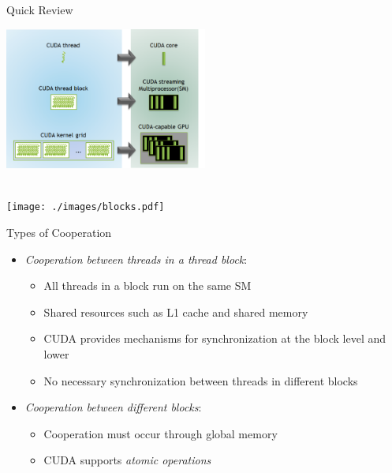 \documentclass[aspectratio=43]{beamer}
\begin{document}
\begin{frame}[fragile]{Quick Review}

\begin{center}
    \includegraphics[width=0.5\textwidth]{./image_png/review.png}
\end{center}
\begin{center}
    \\
    \vspace{0.25cm}
    \centering \texttt{[image: ./images/blocks.pdf]}
\end{center}

\end{frame}

\begin{frame}[fragile]{Types of Cooperation}
\begin{itemize}
        \item \emph{Cooperation between threads in a thread block}:
        \begin{itemize}
            \item All threads in a block run on the same SM
            \item Shared resources such as L1 cache and shared memory
            \item CUDA provides mechanisms for synchronization at the block level and lower
            \item No necessary synchronization between threads in different blocks
        \end{itemize}
        \vspace{0.5cm}
        \item \emph{Cooperation between different blocks}:
        \begin{itemize}
            \item Cooperation must occur through global memory
            \item CUDA supports \textit{atomic operations}
        \end{itemize}
\end{itemize}

\end{frame}
\end{document}
